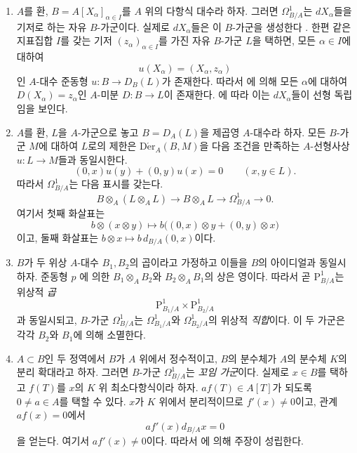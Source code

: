 \begin{examples}[20.4.13]
\label{0.20.4.13-ko}
\begin{enumerate}
  \item[\rm(i)] $A$를 환,
  $B=A[X_\alpha]_{\alpha\in I}$를 $A$ 위의 다항식 대수라 하자.
  그러면 $\Omega^1_{B/A}$는 $dX_\alpha$들을 기저로 하는 자유
  $B$-가군이다. 실제로 $dX_\alpha$들은 이 $B$-가군을 생성한다
  . 한편 같은 지표집합 $I$를 갖는 기저
  $(z_\alpha)_{\alpha\in I}$를 가진 자유 $B$-가군 $L$을 택하면,
  모든 $\alpha\in I$에 대하여
  \[
    u(X_\alpha)=(X_\alpha,z_\alpha)
  \]
  인 $A$-대수 준동형 $u:B\to D_B(L)$가 존재한다. 따라서
  에 의해 모든 $\alpha$에 대하여
  $D(X_\alpha)=z_\alpha$인 $A$-미분 $D:B\to L$이 존재한다.
  에 따라 이는 $dX_\alpha$들이 선형 독립임을
  보인다.

  \item[\rm(ii)] $A$를 환, $L$을 $A$-가군으로 놓고
  $B=D_A(L)$을 제곱영 $A$-대수라 하자. 모든 $B$-가군 $M$에 대하여
  $L$로의 제한은 $\operatorname{D\acute{e}r}_A(B,M)$을 다음 조건을
  만족하는 $A$-선형사상 $u:L\to M$들과 동일시한다.
  \[
    (0,x)u(y)+(0,y)u(x)=0
    \qquad(x,y\in L).
  \]
  따라서 $\Omega^1_{B/A}$는 다음 표시를 갖는다.
  \[
    B\otimes_A(L\otimes_A L)\longrightarrow
    B\otimes_A L\longrightarrow
    \Omega^1_{B/A}\longrightarrow0.
  \]
  여기서 첫째 화살표는
  \[
    b\otimes(x\otimes y)\longmapsto
    b\bigl((0,x)\otimes y+(0,y)\otimes x\bigr)
  \]
  이고, 둘째 화살표는
  $b\otimes x\mapsto b\,d_{B/A}(0,x)$이다.

  \item[\rm(iii)] $B$가 두 위상 $A$-대수 $B_1,B_2$의 곱이라고
  가정하고 이들을 $B$의 아이디얼과 동일시하자. 준동형 $p$
  에 의한
  $B_1\otimes_A B_2$와 $B_2\otimes_A B_1$의 상은 영이다. 따라서
  곧 $\mathrm P^1_{B/A}$는 위상적 \emph{곱}
  \[
    \mathrm P^1_{B_1/A}\times\mathrm P^1_{B_2/A}
  \]
  과 동일시되고, $B$-가군 $\Omega^1_{B/A}$는
  $\Omega^1_{B_1/A}$와 $\Omega^1_{B_2/A}$의 위상적
  \emph{직합}이다. 이 두 가군은 각각 $B_2$와 $B_1$에 의해
  소멸한다.

  \item[\rm(iv)] $A\subset B$인 두 정역에서 $B$가 $A$ 위에서
  정수적이고, $B$의 분수체가 $A$의 분수체 $K$의 분리 확대라고
  하자. 그러면 $B$-가군 $\Omega^1_{B/A}$는 \emph{꼬임 가군}이다.
  실제로 $x\in B$를 택하고 $f(T)$를 $x$의 $K$ 위 최소다항식이라
  하자. $af(T)\in A[T]$가 되도록 $0\neq a\in A$를 택할 수 있다.
  $x$가 $K$ 위에서 분리적이므로 $f'(x)\neq0$이고, 관계
  $af(x)=0$에서
  \[
    a f'(x)d_{B/A}x=0
  \]
  을 얻는다. 여기서 $a f'(x)\neq0$이다. 따라서
  에 의해 주장이 성립한다.
\end{enumerate}
\end{examples}

